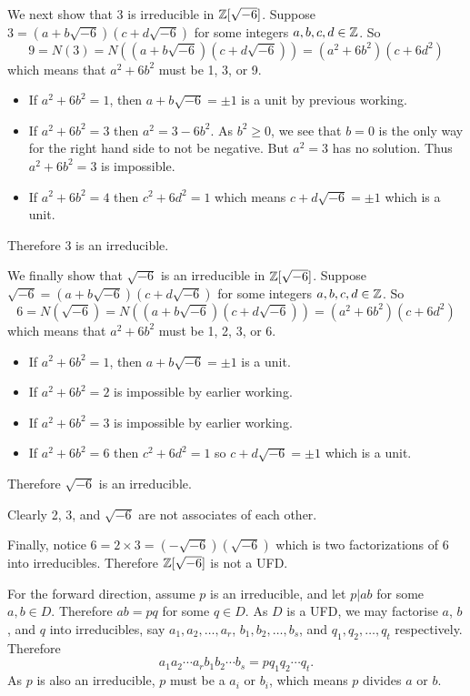 \begin{questions}
    We next show that 3 is irreducible in $\mathbb{Z}[\sqrt{-6}]$. Suppose $3 = (a+b\sqrt{-6})(c+d\sqrt{-6})$ for some integers $a,b,c,d\in \mathbb{Z}$. So
    \[
        9 = N(3) = N((a+b\sqrt{-6})(c+d\sqrt{-6})) = (a^2+6b^2)(c+6d^2)
    \]
    which means that $a^2+6b^2$ must be 1, 3, or 9.
    \begin{itemize}
        \item If $a^2+6b^2 = 1$, then $a+b\sqrt{-6} = \pm1$ is a unit by previous working.
        \item If $a^2+6b^2 = 3$ then $a^2 = 3 - 6b^2$. As $b^2 \geq 0$, we see that $b = 0$ is the only way for the right hand side to not be negative. But $a^2 = 3$ has no solution. Thus $a^2+6b^2 = 3$ is impossible.
        \item If $a^2+6b^2 = 4$ then $c^2+6d^2 = 1$ which means $c+d\sqrt{-6} = \pm1$ which is a unit.
    \end{itemize}
    Therefore 3 is an irreducible.

    We finally show that $\sqrt{-6}$ is an irreducible in $\mathbb{Z}[\sqrt{-6}]$. Suppose $\sqrt{-6} = (a+b\sqrt{-6})(c+d\sqrt{-6})$ for some integers $a,b,c,d\in \mathbb{Z}$. So
    \[
        6 = N(\sqrt{-6}) = N((a+b\sqrt{-6})(c+d\sqrt{-6})) = (a^2+6b^2)(c+6d^2)
    \]
    which means that $a^2+6b^2$ must be 1, 2, 3, or 6.
    \begin{itemize}
        \item If $a^2+6b^2 = 1$, then $a+b\sqrt{-6} = \pm1$ is a unit.
        \item If $a^2+6b^2 = 2$ is impossible by earlier working.
        \item If $a^2+6b^2 = 3$ is impossible by earlier working.
        \item If $a^2+6b^2 = 6$ then $c^2+6d^2 = 1$ so $c+d\sqrt{-6} = \pm1$ which is a unit.
    \end{itemize}
    Therefore $\sqrt{-6}$ is an irreducible.

    Clearly 2, 3, and $\sqrt{-6}$ are not associates of each other.

    Finally, notice $6 = 2 \times 3 = (-\sqrt{-6})(\sqrt{-6})$ which is two factorizations of 6 into irreducibles. Therefore $\mathbb{Z}[\sqrt{-6}]$ is not a UFD.

    \item For the forward direction, assume $p$ is an irreducible, and let $p \vert ab$ for some $a,b \in D$. Therefore $ab = pq$ for some $q \in D$. As $D$ is a UFD, we may factorise $a$, $b$, and $q$ into irreducibles, say $a_1, a_2, \dots, a_r$, $b_1, b_2, \dots, b_s$, and $q_1, q_2, \dots, q_t$ respectively. Therefore
    \[
        a_1a_2\cdots a_r b_1b_2\cdots b_s = p q_1q_2\cdots q_t.
    \]
    As $p$ is also an irreducible, $p$ must be a $a_i$ or $b_i$, which means $p$ divides $a$ or $b$.


\end{questions}
